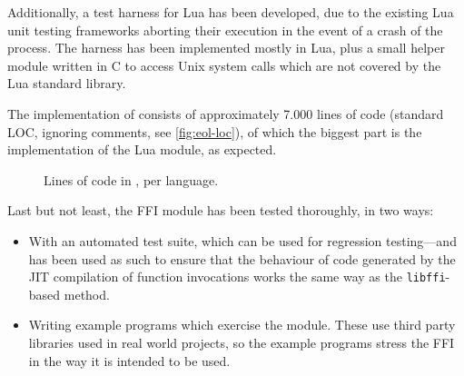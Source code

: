 Additionally, a test harness for Lua has been developed, due to the existing
Lua unit testing frameworks aborting their execution in the event of a crash
of the process. The harness has been implemented mostly in Lua, plus a small
helper module written in C to access Unix system calls which are not covered
by the Lua standard library.

The implementation of \Eol* consists of approximately 7.000 lines of code (standard LOC, ignoring comments, see
\autoref{fig:eol-loc}), of which the biggest part is the implementation of the
\Eol* Lua module, as expected.

\begin{figure}[ht]
	\centering
	\caption{Lines of code in \Eol*, per language.}
	\label{fig:eol-loc}
\end{figure}

Last but not least, the \Eol* FFI module has been tested thoroughly, in two
ways:

\begin{itemize}

	\item With an automated test suite, which can be used for regression
	testing—and has been used as such to ensure that the behaviour of code
	generated by the JIT compilation of function invocations works the same
	way as the \verb|libffi|-based method.

	\item Writing example programs which exercise the module. These use third
	party libraries used in real world projects, so the example programs
	stress the FFI in the way it is intended to be used.

\end{itemize}



